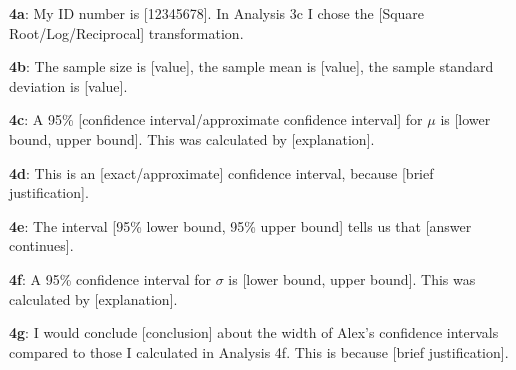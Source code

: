 \documentclass[a4paper,12pt]{article}
\begin{document}
\textbf{4a}: My ID number is [12345678]. In Analysis 3c I chose the [Square Root/Log/Reciprocal] transformation.\bigskip

\textbf{4b}: The sample size is [value], the sample mean is [value], the sample standard deviation is [value].\bigskip

\textbf{4c}: A 95\% [confidence interval/approximate confidence interval] for $\mu$ is [lower bound, upper bound]. This was calculated by [explanation].\bigskip

\textbf{4d}: This is an [exact/approximate] confidence interval, because [brief justification].\bigskip

\textbf{4e}: The interval [95\% lower bound, 95\% upper bound] tells us that [answer continues].\bigskip

\textbf{4f}: A 95\% confidence interval for $\sigma$ is [lower bound, upper bound]. This was calculated by [explanation].\bigskip

\textbf{4g}: I would conclude [conclusion] about the width of Alex's confidence intervals compared to those I calculated in Analysis 4f. This is because [brief justification].
\end{document}
